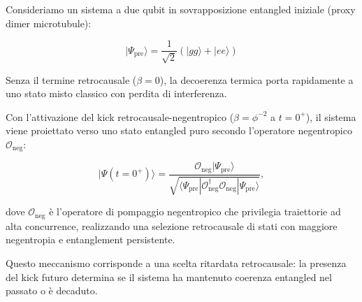 \documentclass[11pt,a4paper]{article}
\theoremstyle{plain}
\theoremstyle{definition}
\begin{document}
Consideriamo un sistema a due qubit in sovrapposizione entangled iniziale (proxy dimer microtubule):

\vspace{0.2cm}

\begin{equation}
|\Psi_{\text{pre}}\rangle = \frac{1}{\sqrt{2}} \left( |gg\rangle + |ee\rangle \right)
\label{eq:wheeler_pre}
\end{equation}


\vspace{0.3cm}

Senza il termine retrocausale ($\beta = 0$), la decoerenza termica porta rapidamente a uno stato misto classico con perdita di interferenza. 


\vspace{0.5cm}

\begin{tcolorbox}[colback=blue!3!white, colframe=blue!80!black,
                  title={Proiezione Retrocausale-Negentropica al Tempo $t=0^+$},
                  fonttitle=\bfseries,
                  boxrule=1.2pt,
                  arc=4pt,
                  left=8pt, right=8pt, top=10pt, bottom=10pt]

Con l'attivazione del kick retrocausale-negentropico ($\beta = \phi^{-2}$ a $t=0^+$), il sistema viene proiettato verso uno stato entangled puro secondo l'operatore negentropico $\mathcal{O}_{\text{neg}}$:

\begin{equation}
|\Psi(t=0^+)\rangle = \frac{\mathcal{O}_{\text{neg}} |\Psi_{\text{pre}}\rangle}{\sqrt{\langle \Psi_{\text{pre}} | \mathcal{O}_{\text{neg}}^\dagger \mathcal{O}_{\text{neg}} | \Psi_{\text{pre}} \rangle}},
\label{eq:wheeler_retro_projection}
\end{equation}

dove $\mathcal{O}_{\text{neg}}$ è l'operatore di pompaggio negentropico che privilegia traiettorie ad alta concurrence, realizzando una selezione retrocausale di stati con maggiore negentropia e entanglement persistente.

\end{tcolorbox}



\clearpage


Questo meccanismo corrisponde a una scelta ritardata retrocausale: la presenza del kick futuro determina se il sistema ha mantenuto coerenza entangled nel passato o è decaduto.

\vspace{0.5cm}
\end{document}
